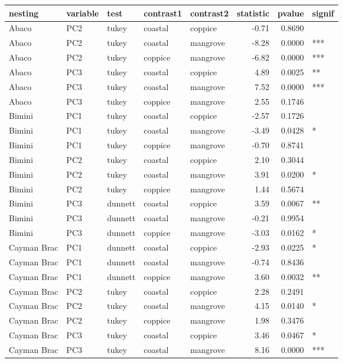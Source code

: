 
\begin{tabular}{lllllrrl}
\toprule
nesting & variable & test & contrast1 & contrast2 & statistic & pvalue & signif\\
\midrule
Abaco & PC2 & tukey & coastal & coppice & -0.71 & 0.8690 & \\
Abaco & PC2 & tukey & coastal & mangrove & -8.28 & 0.0000 & ***\\
Abaco & PC2 & tukey & coppice & mangrove & -6.82 & 0.0000 & ***\\
Abaco & PC3 & tukey & coastal & coppice & 4.89 & 0.0025 & **\\
Abaco & PC3 & tukey & coastal & mangrove & 7.52 & 0.0000 & ***\\
\addlinespace
Abaco & PC3 & tukey & coppice & mangrove & 2.55 & 0.1746 & \\
Bimini & PC1 & tukey & coastal & coppice & -2.57 & 0.1726 & \\
Bimini & PC1 & tukey & coastal & mangrove & -3.49 & 0.0428 & *\\
Bimini & PC1 & tukey & coppice & mangrove & -0.70 & 0.8741 & \\
Bimini & PC2 & tukey & coastal & coppice & 2.10 & 0.3044 & \\
\addlinespace
Bimini & PC2 & tukey & coastal & mangrove & 3.91 & 0.0200 & *\\
Bimini & PC2 & tukey & coppice & mangrove & 1.44 & 0.5674 & \\
Bimini & PC3 & dunnett & coastal & coppice & 3.59 & 0.0067 & **\\
Bimini & PC3 & dunnett & coastal & mangrove & -0.21 & 0.9954 & \\
Bimini & PC3 & dunnett & coppice & mangrove & -3.03 & 0.0162 & *\\
\addlinespace
Cayman Brac & PC1 & dunnett & coastal & coppice & -2.93 & 0.0225 & *\\
Cayman Brac & PC1 & dunnett & coastal & mangrove & -0.74 & 0.8436 & \\
Cayman Brac & PC1 & dunnett & coppice & mangrove & 3.60 & 0.0032 & **\\
Cayman Brac & PC2 & tukey & coastal & coppice & 2.28 & 0.2491 & \\
Cayman Brac & PC2 & tukey & coastal & mangrove & 4.15 & 0.0140 & *\\
\addlinespace
Cayman Brac & PC2 & tukey & coppice & mangrove & 1.98 & 0.3476 & \\
Cayman Brac & PC3 & tukey & coastal & coppice & 3.46 & 0.0467 & *\\
Cayman Brac & PC3 & tukey & coastal & mangrove & 8.16 & 0.0000 & ***\\

\end{tabular}
